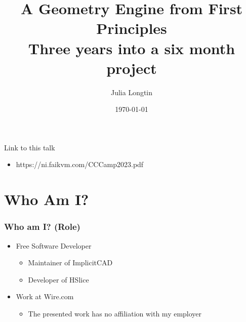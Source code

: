 \documentclass[hyperref={pdfpagemode=FullScreen},aspectratio=169]{beamer}
\title[CCCamp]{A Geometry Engine from First Principles \\
               \large Three years into a six month project} %
\author{Julia Longtin} %
\institute[HSlice] %
{
HSlice Project \\ %
\medskip
\textit{julia.longtin@gmail.com} %
}
\date{\today} %
\begin{document}
\begin{frame}
  \titlepage %
  \begin{block}{Link to this talk}
    \begin{itemize}
    \item https://ni.faikvm.com/CCCamp2023.pdf
    \end{itemize}
  \end{block}
\end{frame}



\section{Who Am I?} %

\begin{frame}
  \frametitle{Who am I? (Role)}
  \begin{itemize}
  \item Free Software Developer
    \begin{itemize}
    \item Maintainer of ImplicitCAD
    \item Developer of HSlice
    \end{itemize}
  \item Work at Wire.com
    \begin{itemize}
    \item The presented work has no affiliation with my employer
    \end{itemize}
  \end{itemize}
\end{frame}
\end{document}

